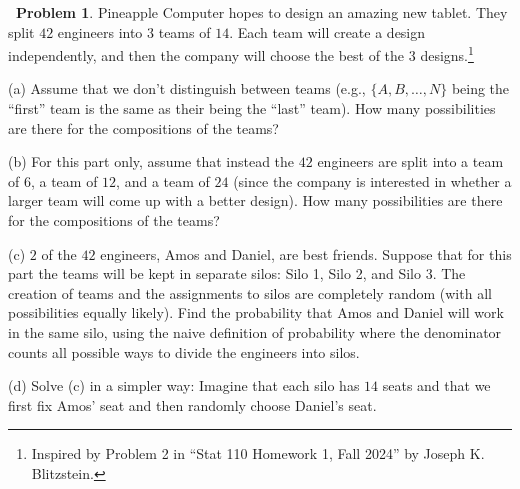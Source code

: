 \documentclass[12pt,oneside]{article}
\theoremstyle{definition}
\newtheorem{problem}{\faPen \ Problem}
\theoremstyle{remark}
\begin{document}
\begin{problem}
Pineapple Computer hopes to design an amazing new tablet. They split $42$ engineers into $3$ teams of $14$. Each team will create a design independently, and then the company will choose the best of the $3$ designs.\footnote{Inspired by Problem 2 in \enquote{Stat 110 Homework 1, Fall 2024} by Joseph K. Blitzstein.}

(a) Assume that we don't distinguish between teams (e.g., $\{A, B, \ldots, N\}$ being the \enquote{first} team is the same as their being the \enquote{last} team). How many possibilities are there for the compositions of the teams? 

(b) For this part only, assume that instead the $42$ engineers are split into a team of $6$, a team of $12$, and a team of $24$ (since the company is interested in whether a larger team will come up with a better design). How many possibilities are there for the compositions of the teams?

(c) $2$ of the $42$ engineers, Amos and Daniel, are best friends. Suppose that for this part the teams will be kept in separate silos: Silo 1, Silo 2, and Silo 3. The creation of teams and the assignments to silos are completely random (with all possibilities equally likely). Find the probability that Amos and Daniel will work in the same silo, using the naive definition of probability where the denominator counts all possible ways to divide the engineers into silos.

(d) Solve (c) in a simpler way: Imagine that each silo has $14$ seats and that we first fix Amos’ seat and then randomly choose Daniel’s seat.
\end{problem}
\end{document}
